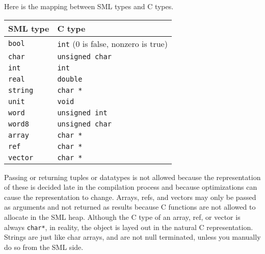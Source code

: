 Here is the mapping between SML types and C types.
\begin{center}
\begin{tabular}{ll}
SML type & C type\\
\hline
{\tt bool} & {\tt int} (0 is false, nonzero is true) \\
{\tt char} & {\tt unsigned char} \\
{\tt int} & {\tt int} \\
{\tt real} & {\tt double} \\
{\tt string} & {\tt char *} \\
{\tt unit} & {\tt void} \\
{\tt word} & {\tt unsigned int} \\
{\tt word8} & {\tt unsigned char} \\
{\tt array} & {\tt char *} \\
{\tt ref} & {\tt char *} \\
{\tt vector} & {\tt char *} \\
\end{tabular}
\end{center}
Passing or returning tuples or datatypes is not allowed because the
representation of these is decided late in the compilation
process and because optimizations can cause the representation to
change.  Arrays, refs, and vectors may only be passed as arguments and
not returned as results because C functions are not allowed to
allocate in the SML heap.  Although the C type of an array, ref, or
vector is always {\tt char*}, in reality, the object is layed out in
the natural C representation.
Strings are just
like char arrays, and are not null terminated, unless you manually do
so from the SML side.



